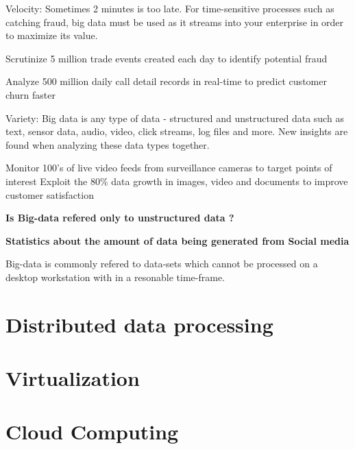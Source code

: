 \documentclass[12pt,a4paper]{report}
\begin{document}
Velocity: Sometimes 2 minutes is too late. For time-sensitive processes such as catching fraud,
big data must be used as it streams into your enterprise in order to maximize its value.

Scrutinize 5 million trade events created each day to identify potential fraud

Analyze 500 million daily call detail records in real-time to predict customer churn faster


Variety: Big data is any type of data - structured and unstructured data such as text,
sensor data, audio, video, click streams, log files and more. New insights are found when
analyzing these data types together.

Monitor 100’s of live video feeds from surveillance cameras to target points of interest
Exploit the 80\% data growth in images, video and documents to improve customer satisfaction






\cite{website:ibm-bigdata} 

{\bf Is Big-data refered only to unstructured data ?}


{\bf Statistics about the amount of data being generated from Social media}

Big-data is commonly refered to data-sets which cannot be processed on a
desktop workstation with in a resonable time-frame.

\section{Distributed data processing}

\section{Virtualization}

\section{Cloud Computing}
\end{document}
